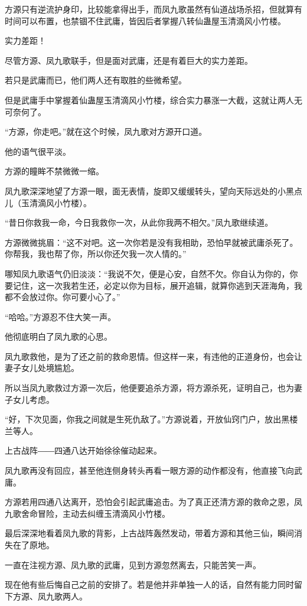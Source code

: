 \begin{this_body}
方源只有逆流护身印，比较能拿得出手，而凤九歌虽然有仙道战场杀招，但就算有时间可以布置，也禁锢不住武庸，皆因后者掌握八转仙蛊屋玉清滴风小竹楼。

实力差距！

尽管方源、凤九歌联手，但是面对武庸，还是有着巨大的实力差距。

若只是武庸而已，他们两人还有取胜的些微希望。

但是武庸手中掌握着仙蛊屋玉清滴风小竹楼，综合实力暴涨一大截，这就让两人无可奈何了。

“方源，你走吧。”就在这个时候，凤九歌对方源开口道。

他的语气很平淡。

方源的瞳眸不禁微微一缩。

凤九歌深深地望了方源一眼，面无表情，旋即又缓缓转头，望向天际远处的小黑点儿（玉清滴风小竹楼）。

“昔日你救我一命，今日我救你一次，从此你我两不相欠。”凤九歌继续道。

方源微微挑眉：“这不对吧。这一次你若是没有我相助，恐怕早就被武庸杀死了。你帮我，我也帮了你，所以你还欠我一次人情的。”

哪知凤九歌语气仍旧淡淡：“我说不欠，便是心安，自然不欠。你自认为你的，你要记住，这一次我若生还，必定以你为目标，展开追辑，就算你逃到天涯海角，我都不会放过你。你可要小心了。”

“哈哈。”方源忍不住大笑一声。

他彻底明白了凤九歌的心思。

凤九歌救他，是为了还之前的救命恩情。但这样一来，有违他的正道身份，也会让妻子女儿处境尴尬。

所以当凤九歌救过方源一次后，他便要追杀方源，将方源杀死，证明自己，也为妻子女儿考虑。

“好，下次见面，你我之间就是生死仇敌了。”方源说着，开放仙窍门户，放出黑楼兰等人。

上古战阵――四通八达开始徐徐催动起来。

凤九歌再没有回应，甚至他连侧身转头再看一眼方源的动作都没有，他直接飞向武庸。

方源若用四通八达离开，恐怕会引起武庸追击。为了真正还清方源的救命之恩，凤九歌舍命冒险，主动去纠缠玉清滴风小竹楼。

最后深深地看着凤九歌的背影，上古战阵轰然发动，带着方源和其他三仙，瞬间消失在了原地。

一直在注视方源、凤九歌的武庸，见到方源忽然离去，只能苦笑一声。

现在他有些后悔自己之前的安排了。若是他并非单独一人的话，自然有能力同时留下方源、凤九歌两人。


\end{this_body}

